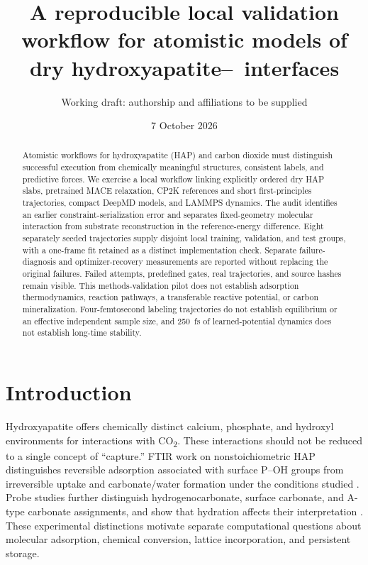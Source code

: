 \documentclass[11pt,a4paper]{article}
\title{A reproducible local validation workflow for atomistic models of dry hydroxyapatite--\COtwo\ interfaces}
\author{Working draft: authorship and affiliations to be supplied}
\date{7 October 2026}
\newcommand{\COtwo}{CO\textsubscript{2}}
\begin{document}
\maketitle
\RunStatusBanner
\begin{abstract}
Atomistic workflows for hydroxyapatite (HAP) and carbon dioxide must distinguish successful execution from chemically meaningful structures, consistent labels, and predictive forces. We exercise a local workflow linking explicitly ordered dry HAP slabs, pretrained MACE relaxation, CP2K references and short first-principles trajectories, compact DeepMD models, and LAMMPS dynamics. The audit identifies an earlier constraint-serialization error and separates fixed-geometry molecular interaction from substrate reconstruction in the reference-energy difference. Eight separately seeded trajectories supply disjoint local training, validation, and test groups, with a one-frame fit retained as a distinct implementation check. \QuantitativeAbstract{} Separate failure-diagnosis and optimizer-recovery measurements are reported without replacing the original failures. Failed attempts, predefined gates, real trajectories, and source hashes remain visible. This methods-validation pilot does not establish adsorption thermodynamics, reaction pathways, a transferable reactive potential, or carbon mineralization. Four-femtosecond labeling trajectories do not establish equilibrium or an effective independent sample size, and 250~fs of learned-potential dynamics does not establish long-time stability.
\end{abstract}

\section{Introduction}
Hydroxyapatite offers chemically distinct calcium, phosphate, and hydroxyl environments for interactions with \COtwo. These interactions should not be reduced to a single concept of ``capture.'' FTIR work on nonstoichiometric HAP distinguishes reversible adsorption associated with surface P--OH groups from irreversible uptake and carbonate/water formation under the conditions studied \citep{cheng1998co2}. Probe studies further distinguish hydrogenocarbonate, surface carbonate, and A-type carbonate assignments, and show that hydration affects their interpretation \citep{diallogarcia2014sites}. These experimental distinctions motivate separate computational questions about molecular adsorption, chemical conversion, lattice incorporation, and persistent storage.
\end{document}
